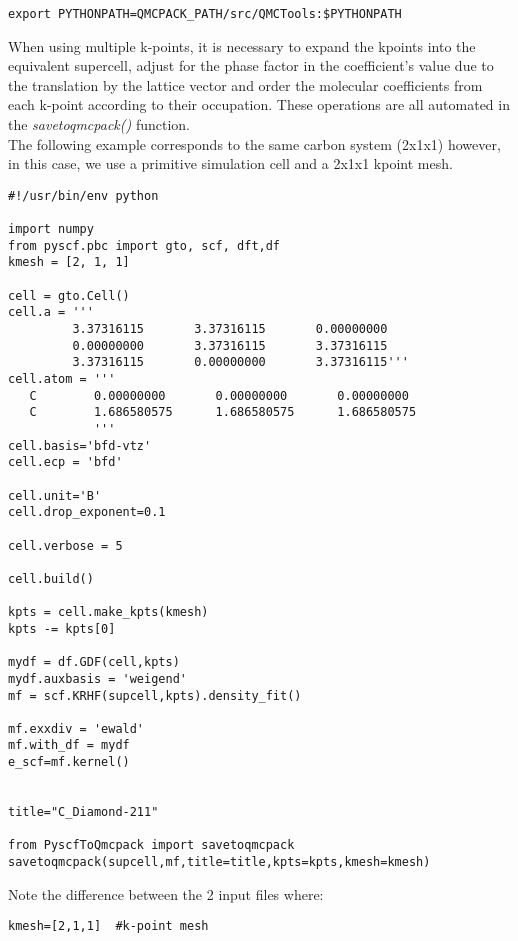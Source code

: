 \begin{lstlisting}
export PYTHONPATH=QMCPACK_PATH/src/QMCTools:$PYTHONPATH
\end{lstlisting}

When using multiple k-points, it is necessary to expand the kpoints into the equivalent supercell, adjust for the phase factor in the coefficient's value due to the translation by the lattice vector and order the molecular coefficients from each k-point according to their occupation. These operations are all automated in the \textit{savetoqmcpack()} function.\\

The following example corresponds to the same carbon system (2x1x1) however, in this case, we use a primitive simulation cell and a 2x1x1 kpoint mesh.   

\begin{lstlisting}[caption=Example PySCF input for single k-point calculation for a 2x1x1 Carbon supercell.]
#!/usr/bin/env python

import numpy
from pyscf.pbc import gto, scf, dft,df
kmesh = [2, 1, 1]

cell = gto.Cell()
cell.a = '''
         3.37316115       3.37316115       0.00000000
         0.00000000       3.37316115       3.37316115
         3.37316115       0.00000000       3.37316115'''
cell.atom = '''  
   C        0.00000000       0.00000000       0.00000000
   C        1.686580575      1.686580575      1.686580575 
            '''
cell.basis='bfd-vtz'
cell.ecp = 'bfd'

cell.unit='B'
cell.drop_exponent=0.1

cell.verbose = 5

cell.build()

kpts = cell.make_kpts(kmesh)
kpts -= kpts[0]

mydf = df.GDF(cell,kpts)
mydf.auxbasis = 'weigend'
mf = scf.KRHF(supcell,kpts).density_fit()

mf.exxdiv = 'ewald'
mf.with_df = mydf
e_scf=mf.kernel()


title="C_Diamond-211"

from PyscfToQmcpack import savetoqmcpack
savetoqmcpack(supcell,mf,title=title,kpts=kpts,kmesh=kmesh)

\end{lstlisting}



Note the difference between the 2 input files where:\\
\begin{lstlisting}
kmesh=[2,1,1]  #k-point mesh
\end{lstlisting}

